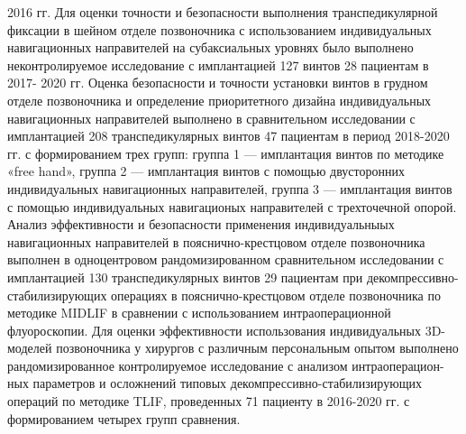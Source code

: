 2016 гг.
      Для оценки точности и безопасности выполнения транспедикулярной
фиксации в шейном отделе позвоночника с использованием индивидуальных
навигационных направителей на субаксиальных уровнях было выполнено
неконтролируемое исследование с имплантацией 127 винтов 28 пациентам в 2017-
2020 гг.
      Оценка безопасности и точности установки винтов в грудном отделе
позвоночника    и   определение   приоритетного    дизайна     индивидуальных
навигационных направителей выполнено в сравнительном исследовании с
имплантацией 208 транспедикулярных винтов 47 пациентам в период 2018-2020
гг. с формированием трех групп: группа 1 — имплантация винтов по методике
«free hand», группа 2 — имплантация винтов с помощью двусторонних
индивидуальных навигационных направителей, группа 3 — имплантация винтов с
помощью индивидуальных навигационых направителей с трехточечной опорой.
      Анализ эффективности и безопасности применения индивидуальныых
навигационных направителей в пояснично-крестцовом отделе позвоночника
выполнен в одноцентровом рандомизированном сравнительном исследовании с
имплантацией 130 транспедикулярных винтов 29 пациентам при декомпрессивно-
стабилизирующих операциях в пояснично-крестцовом отделе позвоночника по
методике   MIDLIF    в   сравнении    с   использованием     интраоперационной
флуороскопии.
      Для оценки эффективности использования индивидуальных 3D-моделей
позвоночника у хирургов с различным персональным опытом выполнено
рандомизированное контролируемое исследование с анализом интраоперацион-
ных параметров и осложнений типовых декомпрессивно-стабилизирующих
операций по методике TLIF, проведенных 71 пациенту в 2016-2020 гг. с
формированием четырех групп сравнения.

